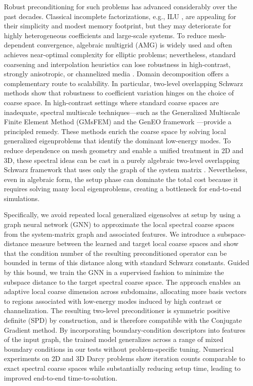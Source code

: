 \documentclass{article}
\theoremstyle{definition}
\theoremstyle{remark}
\begin{document}
Robust preconditioning for such problems has advanced considerably over the past decades.
Classical incomplete factorizations, e.g., ILU \cite{meijerink1977iterative,saad2003iterative}, are appealing for their simplicity and modest memory footprint, but they may deteriorate for highly heterogeneous coefficients and large-scale systems.
To reduce mesh-dependent convergence, algebraic multigrid (AMG) \cite{ruge1987algebraic} is widely used and often achieves near-optimal complexity for elliptic problems; nevertheless, standard coarsening and interpolation heuristics can lose robustness in high-contrast, strongly anisotropic, or channelized media \cite{wan1999energy}.
Domain decomposition offers a complementary route to scalability.
In particular, two-level overlapping Schwarz methods \cite{toselli2004domain,dolean2015introduction} show that robustness to coefficient variation hinges on the choice of coarse space.
In high-contrast settings where standard coarse spaces are inadequate, spectral multiscale techniques—such as the Generalized Multiscale Finite Element Method (GMsFEM) \cite{efendiev2011multiscale,efendiev2013generalized,chung2018constraint,chung2023multiscale,ye2024robust} and the GenEO framework \cite{spillane2014abstract,dolean2015introduction}—provide a principled remedy.
These methods enrich the coarse space by solving local generalized eigenproblems that identify the dominant low-energy modes.
To reduce dependence on mesh geometry and enable a unified treatment in 2D and 3D, these spectral ideas can be cast in a purely algebraic two-level overlapping Schwarz framework that uses only the graph of the system matrix \cite{heinlein2018frosch,ADDThm,ADD,al2025robust}.
Nevertheless, even in algebraic form, the setup phase can dominate the total cost because it requires solving many local eigenproblems, creating a bottleneck for end-to-end simulations.

Specifically, we avoid repeated local generalized eigensolves at setup by using a graph neural network (GNN) to approximate the local spectral coarse spaces from the system-matrix graph and associated features.
We introduce a subspace-distance measure between the learned and target local coarse spaces and show that the condition number of the resulting preconditioned operator can be bounded in terms of this distance along with standard Schwarz constants.
Guided by this bound, we train the GNN in a supervised fashion to minimize the subspace distance to the target spectral coarse space.
The approach enables an adaptive local coarse dimension across subdomains, allocating more basis vectors to regions associated with low-energy modes induced by high contrast or channelization.
The resulting two-level preconditioner is symmetric positive definite (SPD) by construction, and is therefore compatible with the Conjugate Gradient method.
By incorporating boundary-condition descriptors into features of the input graph, the trained model generalizes across a range of mixed boundary conditions in our tests without problem-specific tuning.
Numerical experiments on 2D and 3D Darcy problems show iteration counts comparable to exact spectral coarse spaces while substantially reducing setup time, leading to improved end-to-end time-to-solution.
\end{document}
